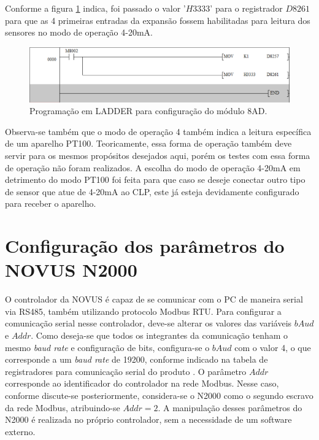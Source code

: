 Conforme a figura \ref{fig:Config8AD} indica, foi passado o valor '$H3333$' para o registrador $D8261$ para que as 4 primeiras entradas da expansão fossem habilitadas para leitura dos sensores no modo de operação 4-20mA.

\begin{figure}[h!]
\centering
\includegraphics[scale=0.68]{Config8AD.png}
\caption{Programação em LADDER para configuração do módulo 8AD.}
\label{fig:Config8AD}
\end{figure}

Observa-se também que o modo de operação 4 também indica a leitura específica de um aparelho PT100. Teoricamente, essa forma de operação também deve servir para os mesmos propósitos desejados aqui, porém os testes com essa forma de operação não foram realizados. A escolha do modo de operação 4-20mA em detrimento do modo PT100 foi feita para que caso se deseje conectar outro tipo de sensor que atue de 4-20mA ao CLP, este já esteja devidamente configurado para receber o aparelho.




\section{Configuração dos parâmetros do NOVUS N2000}

O controlador da NOVUS é capaz de se comunicar com o PC de maneira serial via RS485, também utilizando protocolo Modbus RTU. Para configurar a comunicação serial nesse controlador, deve-se alterar os valores das variáveis $bAud$ e $Addr$. Como deseja-se que todos os integrantes da comunicação tenham o mesmo \textit{baud rate} e configuração de bits, configura-se o $bAud$ com o valor 4, o que corresponde a um \textit{baud rate} de 19200, conforme indicado na tabela de registradores para comunicação serial do produto \cite{novus2014modbus}. O parâmetro $Addr$ corresponde ao identificador do controlador na rede Modbus. Nesse caso, conforme discute-se posteriormente, considera-se o N2000 como o segundo escravo da rede Modbus, atribuindo-se $Addr = 2$. A manipulação desses parâmetros do N2000 é realizada no próprio controlador, sem a necessidade de um software externo.

